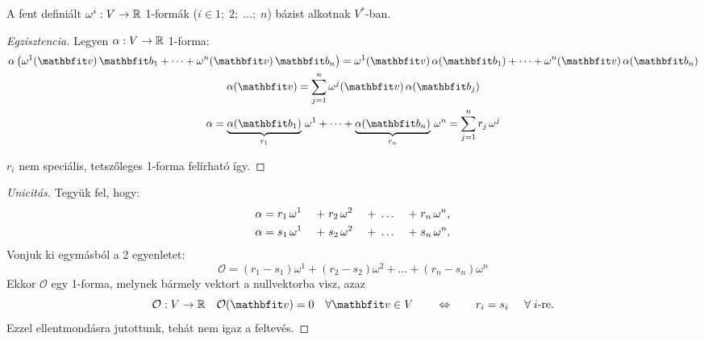 \begin{statement}
  A fent definiált $\omega^i: V \rightarrow \mathbb{R}$ 1-formák
  ($i \in {1;\; 2;\; \dots;\; n}$) bázist alkotnak $V^*$-ban.

  \begin{minipage}{\textwidth}
    \begin{proof}[Egzisztencia]
      Legyen $\alpha: V \rightarrow \mathbb{R}$ 1-forma:
      \begin{gather*}
        \alpha \left(
        \omega^1(\rvec v) \, \rvec{b_1}
        + \dots
        + \omega^n(\rvec v) \, \rvec{b_n}
        \right)
        = \omega^1(\rvec v) \, \alpha(\rvec b_1)
        + \dots
        + \omega^n(\rvec v) \, \alpha(\rvec b_n)
        \\
        \alpha(\rvec v)
        = \sum_{j=1}^n \omega^j(\rvec v) \, \alpha(\rvec b_j)
        \\
        \alpha
        = \underbrace{\alpha(\rvec b_1)}_{r_1} \, \omega^1
        + \dots
        + \underbrace{\alpha(\rvec b_n)}_{r_n} \, \omega^n
        = \sum_{j=1}^n r_j \, \omega^j
      \end{gather*}

      $r_i$ nem speciális, tetszőleges 1-forma felírható így.
    \end{proof}
  \end{minipage}

  \begin{proof}[Unicitás]
    Tegyük fel, hogy:
    \vspace{-1em}
    \begin{alignat*}{9}
      \alpha & = r_1 \, \omega^1 & \;+\;
             & r_2 \, \omega^2   & \;+\;
             & \dots             & \;+\;
             & r_n \, \omega^n
      \text,                             \\
      \alpha & = s_1 \, \omega^1 & \;+\;
             & s_2 \, \omega^2   & \;+\;
             & \dots             & \;+\;
             & s_n \, \omega^n
      \text.
    \end{alignat*}
    Vonjuk ki egymásból a 2 egyenletet:
    $$
      \mathcal O
      = (r_1 - s_1) \omega^1
      + (r_2 - s_2) \omega^2
      + \dots
      + (r_n - s_n) \omega^n
    $$
    Ekkor $\mathcal O$ egy 1-forma, melynek bármely vektort a nullvektorba
    visz, azaz
    $$
      \mathcal O: V \rightarrow \Reals
      \quad
      \mathcal O(\rvec v) = 0
      \quad
      \forall \rvec v \in V
      \qquad \Leftrightarrow \qquad
      r_i = s_i \hspace{5mm} \forall \; i \text{-re}
      \text.
    $$
    Ezzel ellentmondásra jutottunk, tehát nem igaz a feltevés.
  \end{proof}
\end{statement}

